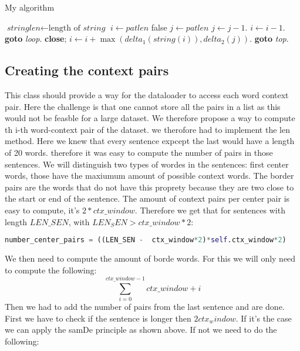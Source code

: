  \begin{algorithm}
\caption{My algorithm}\label{euclid}
\begin{algorithmic}[1]
\State $\textit{stringlen} \gets \text{length of }\textit{string}$
\State $i \gets \textit{patlen}$
 \Return false
\EndIf
\State $j \gets \textit{patlen}$
\State $j \gets j-1$.
\State $i \gets i-1$.
\State \textbf{goto} \emph{loop}.
\State \textbf{close};
\EndIf
\State $i \gets i+\max(\textit{delta}_1(\textit{string}(i)),\textit{delta}_2(j))$.
\State \textbf{goto} \emph{top}.
\EndProcedure
\end{algorithmic}
\end{algorithm}
\subsection{Creating the context pairs}
This class should provide a way for the dataloader to access each word context pair. Here the challenge is that one cannot store all the pairs in a list as this would not be feasble for a large dataset. We therefore propose a way to compute th i-th word-context pair of the dataset. we therofore had to implement the len method. Here we knew that every sentence expcept the last would have a length of 20 words. therefore it was easy to compute the number of pairs in those sentences.
We will distinguish two types of wordes in the sentences: first center words, those have the maxiumum amount of possible context words. The border pairs are the words that do not have this proprety because they are two close to the start or end of the sentence. The amount of context pairs per center pair is easy to compute, it's $2*ctx\_window$. Therefore we get that for sentences with length $LEN\_SEN$, with $LEN_SEN  > ctx\_window*2$:
\begin{lstlisting}[language=python]
number_center_pairs = ((LEN_SEN -  ctx_window*2)*self.ctx_window*2)
\end{lstlisting}
We then need to compute the amount of borde words. For this we will only need to compute the following:
\begin{equation}
\sum_{i=0}^{ctx\_window -1} ctx\_window + i
\end{equation}
 Then we had to add the number of pairs from the last sentence and are done. First  we have to check if the sentence is longer then $2 ctx_window$. 
 If it's the case we can apply the samDe principle as shown above. If not we need to do the following:\\
